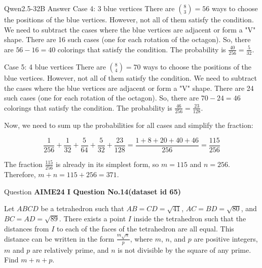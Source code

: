 \begin{answerbox}{Qwen2.5-32B Answer}
Case 4: 3 blue vertices
There are $\binom{8}{3} = 56$ ways to choose the positions of the blue vertices. However, not all of them satisfy the condition. We need to subtract the cases where the blue vertices are adjacent or form a "V" shape. There are 16 such cases (one for each rotation of the octagon). So, there are $56 - 16 = 40$ colorings that satisfy the condition. The probability is $\frac{40}{256} = \frac{5}{32}$.



Case 5: 4 blue vertices
There are $\binom{8}{4} = 70$ ways to choose the positions of the blue vertices. However, not all of them satisfy the condition. We need to subtract the cases where the blue vertices are adjacent or form a "V" shape. There are 24 such cases (one for each rotation of the octagon). So, there are $70 - 24 = 46$ colorings that satisfy the condition. The probability is $\frac{46}{256} = \frac{23}{128}$.

Now, we need to sum up the probabilities for all cases and simplify the fraction:

\[\frac{1}{256} + \frac{1}{32} + \frac{5}{64} + \frac{5}{32} + \frac{23}{128} = \frac{1 + 8 + 20 + 40 + 46}{256} = \frac{115}{256}\]

The fraction $\frac{115}{256}$ is already in its simplest form, so $m = 115$ and $n = 256$. Therefore, $m + n = 115 + 256 = \boxed{371}$.

\end{answerbox}






\begin{questionbox}{ Question }
\textbf{AIME24 I Question No.14(dataset id 65)}\footnotemark


Let $ABCD$ be a tetrahedron such that $AB=CD= \sqrt{41}$, $AC=BD= \sqrt{80}$, and $BC=AD= \sqrt{89}$. There exists a point $I$ inside the tetrahedron such that the distances from $I$ to each of the faces of the tetrahedron are all equal. This distance can be written in the form $\frac{m \sqrt n}{p}$, where $m$, $n$, and $p$ are positive integers, $m$ and $p$ are relatively prime, and $n$ is not divisible by the square of any prime. Find $m+n+p$.
\end{questionbox}



